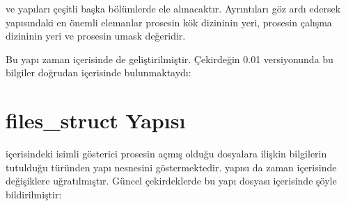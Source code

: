 \documentclass[a4paper,10pt,turkish]{sphinxmanual}
\begin{document}
\sphinxAtStartPar
{} ve  yapıları çeşitli başka bölümlerde ele alınacaktır. Ayrıntıları göz
ardı edersek  yapısındaki en önemli elemanlar prosesin kök dizininin yeri, prosesin
çalışma dizininin yeri ve prosesin umask değeridir.

\sphinxAtStartPar
Bu yapı zaman içerisinde de geliştirilmiştir. Çekirdeğin 0.01 versiyonunda bu bilgiler doğrudan
 içerisinde bulunmaktaydı:

\begin{sphinxVerbatim}[commandchars=\\\{\}]


\end{sphinxVerbatim}


\section{files\_struct Yapısı}
\label{\detokenize{filesystem1:files-struct-yapisi}}
\sphinxAtStartPar
{} içerisindeki  isimli gösterici prosesin açmış olduğu dosyalara ilişkin
bilgilerin tutulduğu  türünden yapı nesnesini göstermektedir. 
yapısı da zaman içerisinde değişiklere uğratılmıştır. Güncel çekirdeklerde bu yapı
 dosyası içerisinde şöyle bildirilmiştir:
\end{document}
